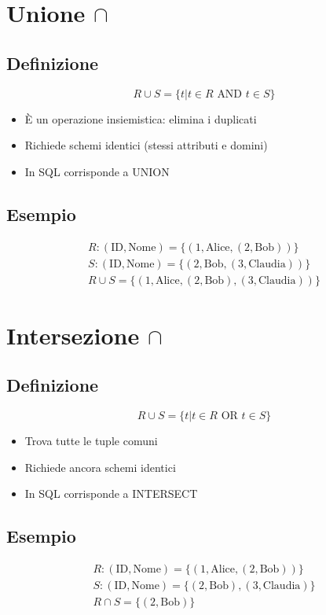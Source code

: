 \newpage
\section{Unione $\cap$}
\subsection{Definizione}
$$
R \cup S = \{t | t \in R \text{ AND } t\in S\}
$$
\begin{itemize}
    \item È un operazione insiemistica: elimina i duplicati
    \item Richiede schemi identici (stessi attributi e domini)
    \item In SQL corrisponde a UNION
\end{itemize}

\subsection{Esempio}
\begin{gather}
    R:(\text{ID},\text{Nome}) = \{(1,\text{Alice},(2,\text{Bob}))\} \\
    S:(\text{ID},\text{Nome}) = \{(2,\text{Bob},(3,\text{Claudia}))\} \\
    R \cup S = \{(1,\text{Alice},(2,\text{Bob}), (3,\text{Claudia}))\}
\end{gather}

\section{Intersezione $\cap$}
\subsection{Definizione}
$$
R \cup S = \{t | t \in R \text{ OR } t\in S\}
$$
\begin{itemize}
    \item Trova tutte le tuple comuni
    \item Richiede ancora schemi identici
    \item In SQL corrisponde a INTERSECT
\end{itemize}

\subsection{Esempio}
\begin{gather}
    R:(\text{ID},\text{Nome}) = \{(1,\text{Alice},(2,\text{Bob}))\} \\
    S:(\text{ID},\text{Nome}) = \{(2,\text{Bob}),(3,\text{Claudia})\} \\
    R \cap S = \{(2,\text{Bob})\}
\end{gather}

